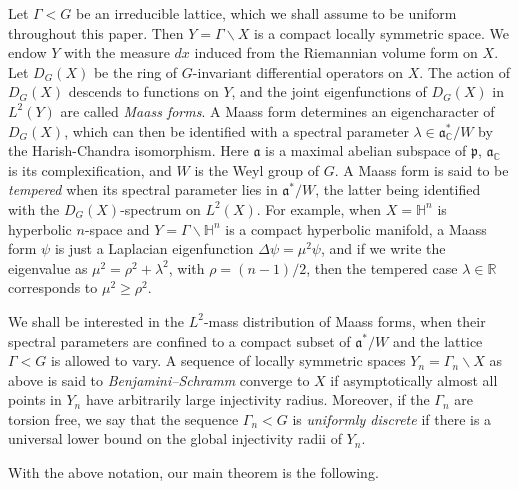 \documentclass[12pt]{amsart}
\theoremstyle{remark}
\newcommand{\R}{\mathbb R}
\newcommand{\C}{\mathbb C}
\newcommand{\ga}{\mathfrak a}
\begin{document}
Let $\Gamma < G$ be an irreducible lattice, which we shall assume to be uniform throughout this paper. Then $Y = \Gamma \backslash X$ is a compact locally symmetric space. We endow $Y$ with the measure $dx$ induced from the Riemannian volume form on $X$. Let $D_{G}(X)$ be the ring of $G$-invariant differential operators on $X$. The action of $D_{G}(X)$ descends to functions on $Y$, and the joint eigenfunctions of $D_G(X)$ in $L^2(Y)$ are called \textit{Maass forms}. A Maass form determines an eigencharacter of $D_G(X)$, which can then be identified with a spectral parameter $\lambda\in\ga_\C^*/W$ by the Harish-Chandra isomorphism. Here $\mathfrak{a}$ is a maximal abelian subspace of $\mathfrak{p}$, $\ga_\C$ is its complexification, and $W$ is the Weyl group of $G$. A Maass form is said to be \textit{tempered} when its spectral parameter lies in $\ga^*/W$, the latter being identified with the $D_G(X)$-spectrum on $L^2(X)$. For example, when $X=\mathbb{H}^n$ is hyperbolic $n$-space and $Y=\Gamma\backslash\mathbb{H}^n$ is a compact hyperbolic manifold, a Maass form $\psi$ is just a Laplacian eigenfunction $\Delta\psi=\mu^2\psi$, and if we write the eigenvalue as $\mu^2=\rho^2+\lambda^2$, with $\rho=(n-1)/2$, then the tempered case $\lambda\in \R$ corresponds to $\mu^2\geq \rho^2$.

We shall be interested in the $L^2$-mass distribution of Maass forms, when their spectral parameters are confined to a compact subset of $\ga^*/W$ and the lattice $\Gamma<G$ is allowed to vary. A sequence of locally symmetric spaces $Y_n=\Gamma_n\backslash X$ as above is said to \textit{Benjamini--Schramm} converge to $X$ if asymptotically almost all points in $Y_n$ have arbitrarily large injectivity radius. Moreover, if the $\Gamma_n$ are torsion free, we say that the sequence $\Gamma_n < G$ is \textit{uniformly discrete} if there is a universal lower bound on the global injectivity radii of $Y_n$.

With the above notation, our main theorem is the following.
\end{document}
